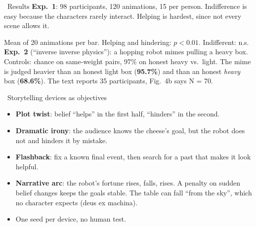 \documentclass[10pt,a4paper]{article}
\newcommand{\note}[1]{{\footnotesize\color{black!70}#1}}
\begin{document}
\begin{minipage}[t]{0.49\linewidth}\vspace{0pt}

\begin{mblock}{\faFlask\ Results}
\textbf{Exp.\ 1}: 98 participants, 120 animations, 15 per person. Indifference is easy because the characters rarely interact. Helping is hardest, since not every scene allows it.\\[0.3em]
{\centering
{}\par}
\note{Mean of 20 animations per bar. Helping and hindering: $p<0.01$. Indifferent: n.s.}\\[0.2em]
\textbf{Exp.\ 2} (``inverse inverse physics''): a hopping robot mimes pulling a heavy box. Controls: chance on same-weight pairs, 97\% on honest heavy vs.\ light. The mime is judged heavier than an honest light box (\textbf{95.7\%}) and than an honest \emph{heavy} box (\textbf{68.6\%}). \note{The text reports 35 participants, Fig.~4b says N = 70.}
\end{mblock}

\begin{mblock}{\faRandom\ Storytelling devices as objectives}
\begin{itemize}
  \item \textbf{Plot twist}: belief ``helps'' in the first half, ``hinders'' in the second.
  \item \textbf{Dramatic irony}: the audience knows the cheese's goal, but the robot does not and hinders it by mistake.
  \item \textbf{Flashback}: fix a known final event, then search for a past that makes it look helpful.
  \item \textbf{Narrative arc}: the robot's fortune rises, falls, rises. A penalty on sudden belief changes keeps the goals stable. The table can fall ``from the sky'', which no character expects (deus ex machina).
  \item One seed per device, no human test.
\end{itemize}
\end{mblock}


\end{minipage}
\end{document}
